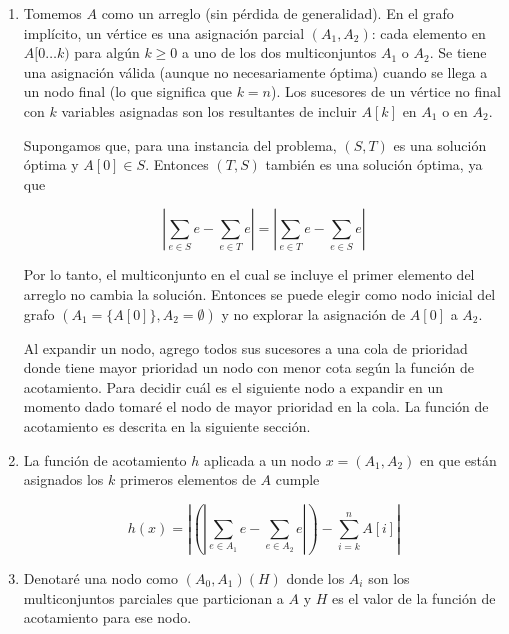 \documentclass{article}
\begin{document}
\begin{enumerate}

 \item

Tomemos $A$ como un arreglo (sin pérdida de generalidad). En el grafo implícito, un vértice es
una asignación parcial $(A_1, A_2)$: cada elemento en $A[0 \ldots k)$ para algún $k \geq 0$ a uno de los dos multiconjuntos
$A_1$ o $A_2$.
Se tiene una asignación válida (aunque no necesariamente óptima) cuando se llega a un nodo final (lo que significa que $k = n$).
Los sucesores de un vértice no final con $k$ variables asignadas
son los resultantes de incluir $A[k]$ en $A_1$ o en $A_2$.

Supongamos que, para una instancia del problema, $(S, T)$ es una solución óptima
y $A[0] \in S$. Entonces $(T, S)$ también es una solución óptima, ya que

$$
\left|\sum_{e \in S} e - \sum_{e \in T} e\right| = \left|\sum_{e \in T} e - \sum_{e \in S} e\right|
$$

Por lo tanto, el multiconjunto en el cual se incluye el primer elemento del arreglo no cambia la solución.
Entonces se puede elegir como nodo inicial del grafo $(A_1 = \{A[0]\}, A_2 = \emptyset)$ y no explorar
la asignación de $A[0]$ a $A_2$.

Al expandir un nodo, agrego todos sus sucesores a una cola de prioridad donde tiene mayor prioridad un nodo
con menor cota según la función de acotamiento.
Para decidir cuál es el siguiente nodo a expandir en un momento dado tomaré el nodo de mayor prioridad
en la cola. La función de acotamiento es descrita en la siguiente sección.

 \item

La función de acotamiento $h$ aplicada a un nodo $x = (A_1, A_2)$ en que están asignados los $k$
primeros elementos de $A$ cumple 

$$
h(x) = \left| \left(\left|\sum_{e \in A_1} e - \sum_{e \in A_2} e\right|\right) - \sum_{i=k}^n A[i] \right|
$$


 \item

Denotaré una nodo como $(A_0,A_1) (H)$ donde los $A_i$ son los multiconjuntos parciales que particionan a
$A$ y $H$ es  el valor de la función de acotamiento para ese nodo.


\end{enumerate}
\end{document}

